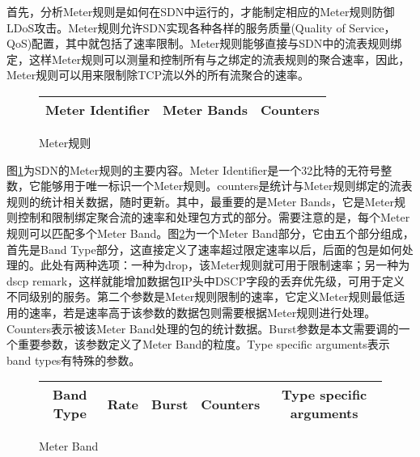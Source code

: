 首先，分析Meter规则是如何在SDN中运行的，才能制定相应的Meter规则防御LDoS攻击。Meter规则允许SDN实现各种各样的服务质量(Quality of Service，QoS)配置，其中就包括了速率限制。Meter规则能够直接与SDN中的流表规则绑定，这样Meter规则可以测量和控制所有与之绑定的流表规则的聚合速率，因此，Meter规则可以用来限制除TCP流以外的所有流聚合的速率。

\begin{figure}[htbp]
	\centering  %
	
	
	\begin{tabular}{|c|c|c|}  
		\hline  %
        Meter Identifier & Meter Bands& Counters \\  %
        \hline
	\end{tabular}
	\caption{Meter规则}  %
	\label{figure:meter}  %
\end{figure}
图\ref{figure:meter}为SDN的Meter规则的主要内容。Meter Identifier是一个32比特的无符号整数，它能够用于唯一标识一个Meter规则。counters是统计与Meter规则绑定的流表规则的统计相关数据，随时更新。其中，最重要的是Meter Bands，它是Meter规则控制和限制绑定聚合流的速率和处理包方式的部分。需要注意的是，每个Meter规则可以匹配多个Meter Band。图\ref{figure:meterbands}为一个Meter Band部分，它由五个部分组成，首先是Band Type部分，这直接定义了速率超过限定速率以后，后面的包是如何处理的。此处有两种选项：一种为drop，该Meter规则就可用于限制速率；另一种为dscp remark，这样就能增加数据包IP头中DSCP字段的丢弃优先级，可用于定义不同级别的服务。第二个参数是Meter规则限制的速率，它定义Meter规则最低适用的速率，若是速率高于该参数的数据包则需要根据Meter规则进行处理。Counters表示被该Meter Band处理的包的统计数据。Burst参数是本文需要调的一个重要参数，该参数定义了Meter Band的粒度。Type specific arguments表示band types有特殊的参数。

\begin{figure}[htbp]
	\centering  %
	
	
	\begin{tabular}{|c|c|c|c|c|}  
		\hline  %
        Band Type & Rate & Burst & Counters & Type specific arguments \\  %
        \hline
		
	\end{tabular}

	\caption{Meter Band}  %
	\label{figure:meterbands}  %
\end{figure}

